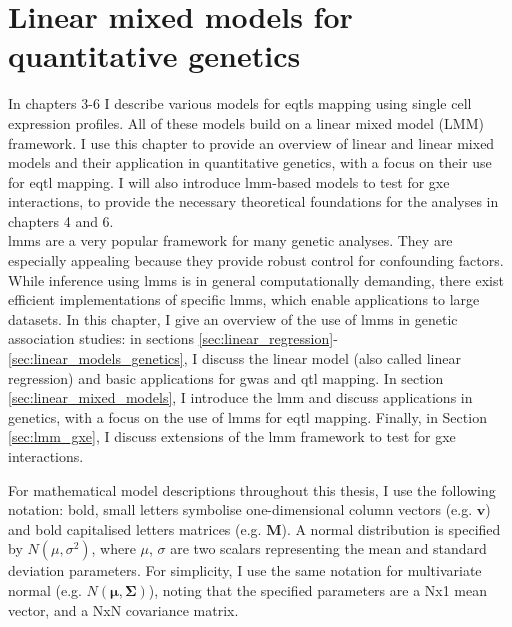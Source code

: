 
\chapter{Linear mixed models for quantitative genetics}

In chapters 3-6 I describe various models for \gls{eqtls} mapping using single cell expression profiles. 
All of these models build on a linear mixed model (LMM) framework. 
I use this chapter to provide an overview of linear and linear mixed models and their application in quantitative genetics, with a focus on their use for \gls{eqtl} mapping. 
I will also introduce \gls{lmm}-based models to test for \gls{gxe} interactions, to provide the necessary theoretical foundations for the analyses in chapters 4 and 6.\\

\gls{lmm}s are a very popular framework for many genetic analyses. 
They are especially appealing because they provide robust control for confounding factors. 
While inference using \gls{lmm}s is in general computationally demanding, there exist efficient implementations of specific \gls{lmm}s, which enable applications to large datasets. 
In this chapter, I give an overview of the use of \gls{lmm}s in genetic association studies: in sections \ref{sec:linear_regression}-\ref{sec:linear_models_genetics}, I discuss the linear model (also called linear regression) and basic applications for \gls{gwas} and \gls{qtl} mapping. 
In section \ref{sec:linear_mixed_models}, I introduce the \gls{lmm} and discuss applications in genetics, with a focus on the use of \gls{lmm}s for \gls{eqtl} mapping. 
Finally, in Section \ref{sec:lmm_gxe}, I discuss extensions of the \gls{lmm} framework to test for \gls{gxe} interactions.\\

\newpage

For mathematical model descriptions throughout this thesis, I use the following notation: bold, small letters symbolise one-dimensional column vectors (e.g. $\mathbf{v}$) and bold capitalised letters matrices (e.g. $\mathbf{M}$). 
A normal distribution is specified by $ N(\mu, \sigma^2)$, where $\mu$, $\sigma$ are two scalars representing the mean and standard deviation parameters.
For simplicity, I use the same notation for multivariate normal (e.g. $ N(\boldsymbol{\mu}, \boldsymbol{\Sigma})$), noting that the specified parameters are a Nx1 mean vector, and a NxN covariance matrix.

